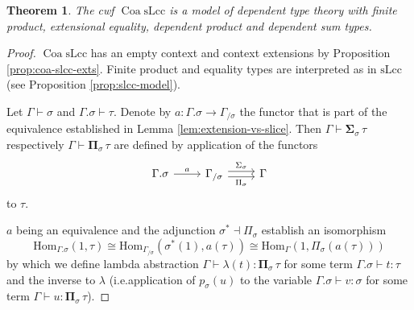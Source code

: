 \documentclass[a4paper]{article}
\newtheorem{theorem}{Theorem}
\theoremstyle{remark}
\theoremstyle{definition}
\begin{document}
\begin{theorem}
  \label{th:lcc-supports-types}
  The cwf $\operatorname{Coa} \mathrm{sLcc}$ is a model of dependent type theory with finite product, extensional equality, dependent product and dependent sum types.
\end{theorem}
\begin{proof}
  $\operatorname{Coa} \mathrm{sLcc}$ has an empty context and context extensions by Proposition \ref{prop:coa-slcc-exts}.
  Finite product and equality types are interpreted as in $\mathrm{sLcc}$ (see Proposition \ref{prop:slcc-model}).

  Let $\Gamma \vdash \sigma$ and $\Gamma.\sigma \vdash \tau$.
  Denote by $a : \Gamma.\sigma \rightarrow \Gamma_{/ \sigma}$ the functor that is part of the equivalence established in Lemma \ref{lem:extension-vs-slice}.
  Then $\Gamma \vdash \mathbf{\Sigma}_\sigma \, \tau$ respectively $\Gamma \vdash \mathbf{\Pi}_\sigma \, \tau$ are defined by application of the functors
  \begin{equation}
    \begin{tikzcd}
      \Gamma.\sigma \arrow[r, "a"] & \Gamma_{/ \sigma} \arrow[r, shift left, "\Sigma_\sigma"] \arrow[r, shift right, "\Pi_\sigma"'] & \Gamma
    \end{tikzcd}
  \end{equation}
  to $\tau$.

  $a$ being an equivalence and the adjunction $\sigma^* \dashv \Pi_\sigma$ establish an isomorphism
  \begin{equation}
    \mathrm{Hom}_{\Gamma.\sigma}(1, \tau) \cong \mathrm{Hom}_{\Gamma_{/ \sigma}}(\sigma^*(1), a(\tau)) \cong \mathrm{Hom}_{\Gamma}(1, \Pi_\sigma(a(\tau)))
  \end{equation}
  by which we define lambda abstraction $\Gamma \vdash \lambda(t) : \mathbf{\Pi}_\sigma \, \tau$ for some term $\Gamma.\sigma \vdash t : \tau$ and the inverse to $\lambda$ (i.e.\@ application of $p_\sigma(u)$ to the variable $\Gamma.\sigma \vdash v : \sigma$ for some term $\Gamma \vdash u : \mathbf{\Pi}_\sigma \, \tau$).


\end{proof}
\end{document}
